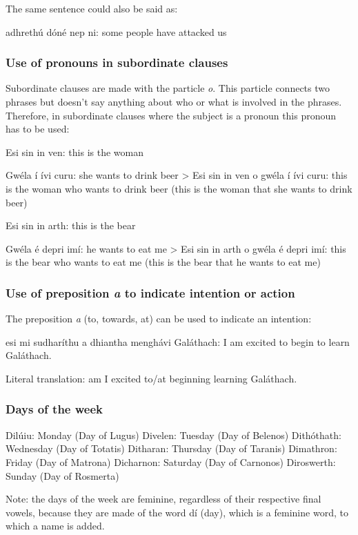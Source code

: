The same sentence could also be said as:

adhreth\'{u} d\'{o}n\'{e} nep ni: some people have attacked us

\subsubsection{Use of pronouns in subordinate clauses}

Subordinate clauses are made with the particle \textit{o}. This particle connects two phrases but doesn't say anything about who or what is involved in the phrases. Therefore, in subordinate clauses where the subject is a pronoun this pronoun has to be used:

Esi sin in ven: this is the woman

Gw\'{e}la \'{i} \'{i}vi curu: she wants to drink beer
> Esi sin in ven o gw\'{e}la \'{i} \'{i}vi curu: this is the woman who wants to drink beer (this is the woman that she wants to drink beer)

Esi sin in arth: this is the bear

Gw\'{e}la \'{e} depri im\'{i}: he wants to eat me
> Esi sin in arth o gw\'{e}la \'{e} depri im\'{i}: this is the bear who wants to eat me (this is the bear that he wants to eat me)

\subsubsection{Use of preposition \textit{a} to indicate intention or action}

The preposition \textit{a} (to, towards, at) can be used to indicate an intention:

esi mi sudhar\'{i}thu a dhiantha mengh\'{a}vi Gal\'{a}thach: I am excited to begin to learn Gal\'{a}thach.

Literal translation: am I excited to/at beginning learning Gal\'{a}thach.

\subsubsection{Days of the week}

Dil\'{u}iu: Monday (Day of Lugus)
Divelen: Tuesday (Day of Belenos)
Dith\'{o}thath: Wednesday (Day of Totatis)
Ditharan: Thursday (Day of Taranis)
Dimathron: Friday (Day of Matrona)
Dicharnon: Saturday (Day of Carnonos)
Diroswerth: Sunday (Day of Rosmerta)

Note: the days of the week are feminine, regardless of their respective final vowels, because they are made of the word d\'{i} (day), which is a feminine word, to which a name is added.

